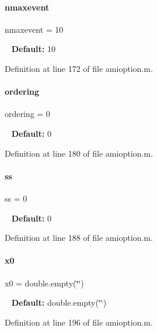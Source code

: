 \paragraph{\texorpdfstring{nmaxevent}{nmaxevent}}
{\footnotesize\ttfamily nmaxevent = 10}

~\newline
{\bfseries{Default\+:}} 10 

Definition at line 172 of file amioption.\+m.

\mbox{\label{classamioption_aa5d555210685086c19e5d08afca6685b}} 
\paragraph{\texorpdfstring{ordering}{ordering}}
{\footnotesize\ttfamily ordering = 0}

~\newline
{\bfseries{Default\+:}} 0 

Definition at line 180 of file amioption.\+m.

\mbox{\label{classamioption_a8f60c8102d29fcd525162d02eed4566b}} 
\paragraph{\texorpdfstring{ss}{ss}}
{\footnotesize\ttfamily ss = 0}

~\newline
{\bfseries{Default\+:}} 0 

Definition at line 188 of file amioption.\+m.

\mbox{\label{classamioption_aa48da42c617fdb7cf84e9a3f80aa04e8}} 
\paragraph{\texorpdfstring{x0}{x0}}
{\footnotesize\ttfamily x0 = double.\+empty(\char`\"{}\char`\"{})}

~\newline
{\bfseries{Default\+:}} double.\+empty(\char`\"{}\char`\"{}) 

Definition at line 196 of file amioption.\+m.

